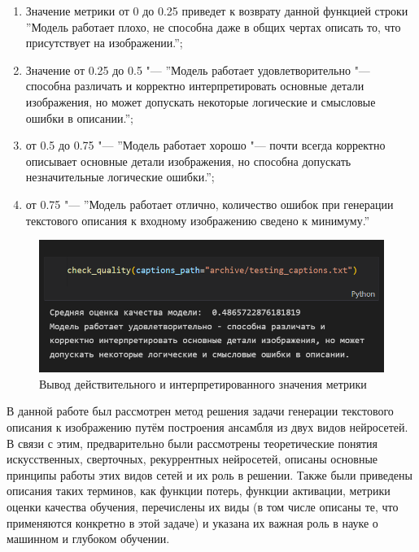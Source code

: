 \documentclass[bachelor, och, coursework]{SCWorks}
\begin{document}
        \begin{enumerate}
            \item Значение метрики от 0 до 0.25 приведет к возврату данной
            функцией строки ''Модель работает плохо, не способна даже в общих
            чертах описать то, что присутствует на изображении.'';
            \item Значение от 0.25 до 0.5 "--- ''Модель работает
            удовлетворительно "--- способна различать и корректно
            интерпретировать основные детали изображения, но может допускать
            некоторые логические и смысловые ошибки в описании.'';
            \item от 0.5 до 0.75 "--- ''Модель работает хорошо "--- почти всегда
            корректно описывает основные детали изображения, но способна
            допускать незначительные логические ошибки.'';
            \item от 0.75 "--- ''Модель работает отлично, количество ошибок при
            генерации текстового описания к входному изображению сведено к
            минимуму.''
        \end{enumerate}

        \begin{figure}[H]
            \centering
            \includegraphics[width=1\textwidth]{pics/metriceval.png}
            \caption{Вывод действительного и интерпретированного
                     значения метрики}
        \end{figure}

\conclusion

    В данной работе был рассмотрен метод решения задачи генерации текстового
    описания к изображению путём построения ансамбля из двух видов нейросетей. В
    связи с этим, предварительно были рассмотрены теоретические понятия
    искусственных, сверточных, рекуррентных нейросетей, описаны основные
    принципы работы этих видов сетей и их роль в решении. Также были приведены
    описания таких терминов, как функции потерь, функции активации, метрики
    оценки качества обучения, перечислены их виды (в том числе описаны те, что
    применяются конкретно в этой задаче) и указана их важная роль в науке о
    машинном и глубоком обучении.
    
\end{document}
